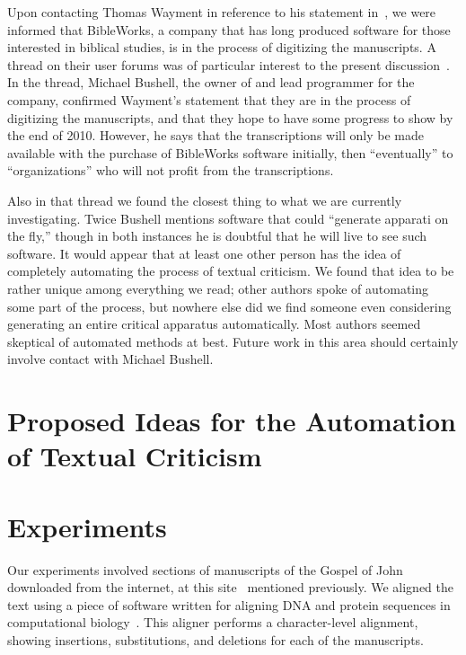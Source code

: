 \documentclass[onecolumn, 12pt]{article}
\begin{document}
Upon contacting Thomas Wayment in reference to his statement
in~\cite{holzapfel-2006-jesus-christ-new-testament}, we were informed that
BibleWorks, a company that has long produced software for those interested in
biblical studies, is in the process of digitizing the manuscripts.  A thread on
their user forums was of particular interest to the present
discussion~\cite{bible-works-forum}.  In the thread, Michael Bushell, the owner
of and lead programmer for the company, confirmed Wayment's statement that they
are in the process of digitizing the manuscripts, and that they hope to have
some progress to show by the end of 2010.  However, he says that the
transcriptions will only be made available with the purchase of BibleWorks
software initially, then ``eventually'' to ``organizations'' who will not
profit from the transcriptions.

Also in that thread we found the closest thing to what we are currently
investigating.  Twice Bushell mentions software that could ``generate apparati
on the fly,'' though in both instances he is doubtful that he will live to see
such software.  It would appear that at least one other person has the idea of
completely automating the process of textual criticism.  We found that idea to
be rather unique among everything we read; other authors spoke of automating
some part of the process, but nowhere else did we find someone even considering
generating an entire critical apparatus automatically.  Most authors seemed
skeptical of automated methods at best.  Future work in this area should
certainly involve contact with Michael Bushell.

\section{Proposed Ideas for the Automation of Textual Criticism}
\label{sec:proposed-ideas}

\section{Experiments}
\label{sec:experiments}

Our experiments involved sections of manuscripts of the Gospel of John
downloaded from the internet, at this site~\cite{igntp-gospel-of-john-online}
mentioned previously.  We aligned the text using a piece of software written
for aligning DNA and protein sequences in computational
biology~\cite{lee-2002-sequence-alignment-poa}.  This aligner performs a
character-level alignment, showing insertions, substitutions, and deletions for
each of the manuscripts.
\end{document}
